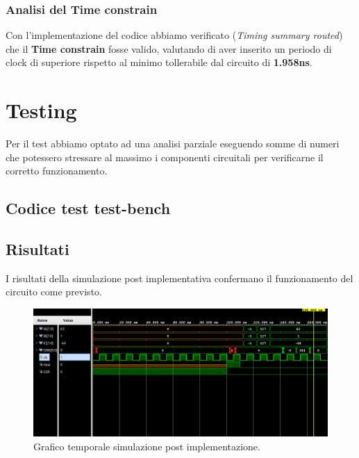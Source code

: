 \documentclass[12pt]{article}
\begin{document}
        \subsubsection{Analisi del Time constrain}
            Con l'implementazione del codice abbiamo verificato (\textit{Timing summary routed}) che il \textbf{Time constrain} fosse valido, valutando di aver inserito un periodo di clock di superiore rispetto al minimo tollerabile dal circuito di \textbf{1.958ns}.
        
\section{Testing}
    Per il test abbiamo optato ad una analisi parziale eseguendo somme di numeri che potessero stressare al massimo i componenti circuitali per verificarne il corretto funzionamento.

    \subsection{Codice test test-bench}
        

    \subsection{Risultati}
        I risultati della simulazione post implementativa confermano il funzionamento del circuito come previsto.

        \begin{figure}[ht]
            \centering
            \includegraphics[scale=0.55]{Test.png}
            \caption{Grafico temporale simulazione post implementazione.}
        \end{figure}
\end{document}
